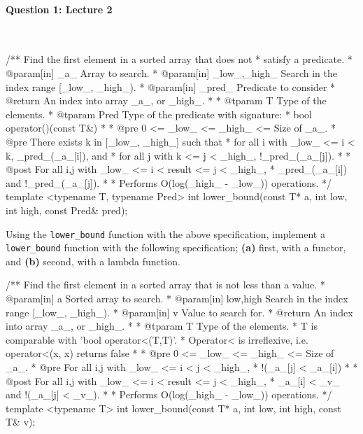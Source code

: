 \documentclass[12pt,letterpaper,twoside]{article}
\begin{document}
\paragraph{Question 1: Lecture 2}
\quad \vspace{-20pt}\\
\begin{cpp}
/** Find the first element in a sorted array that does not 
 *  satisfy a predicate.
 * @param[in] _a_         Array to search.
 * @param[in] _low_,_high_  Search in the index range [_low_, _high_).
 * @param[in] _pred_      Predicate to consider
 * @return  An index into array _a_, or _high_.
 *
 * @tparam T     Type of the elements. 
 * @tparam Pred Type of the predicate with signature:
 *                bool operator()(const T&)
 *
 * @pre  0 <= _low_ <= _high_ <= Size of _a_.
 * @pre  There exists k in [_low_, _high_] such that
 *   for all i with _low_ <= i < k, _pred_(_a_[i]), and
 *   for all j with k <= j < _high_, !_pred_(_a_[j]).
 *
 * @post For all i,j with _low_ <= i < result <= j < _high_, 
 *           _pred_(_a_[i]) and !_pred_(_a_[j]).
 *
 * Performs O(log(_high_ - _low_)) operations.
 */
template <typename T, typename Pred>
int lower_bound(const T* a, int low, int high, const Pred& pred);
\end{cpp}

Using the \texttt{lower\_bound} function with the above specification, implement a \texttt{lower\_bound} function with the following specification; \textbf{(a)} first, with a functor, and \textbf{(b)} second, with a lambda function.
\begin{cpp}
/** Find the first element in a sorted array that is not less than a value.
 * @param[in] a         Sorted array to search.
 * @param[in] low,high  Search in the index range [_low_, _high_).
 * @param[in] v         Value to search for.
 * @return  An index into array _a_, or _high_.
 *
 * @tparam T Type of the elements. 
 *   T is comparable with 'bool operator<(T,T)'.
 *   Operator< is irreflexive, i.e. operator<(x, x) returns false
 *
 * @pre  0 <= _low_ <= _high_ <= Size of _a_.
 * @pre  For all i,j with _low_ <= i < j < _high_, 
 *          !(_a_[j] < _a_[i])
 *
 * @post For all i,j with _low_ <= i < result <= j < _high_, 
 *          _a_[i] < _v_ and !(_a_[j] < _v_).
 *
 * Performs O(log(_high_ - _low_)) operations.
 */
template <typename T>
int lower_bound(const T* a, int low, int high, const T& v);
\end{cpp}
\begin{solution}

\end{solution}
\end{document}

